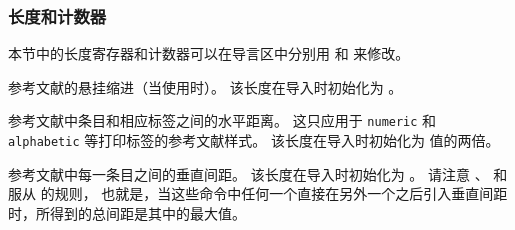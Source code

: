 \subsubsection{长度和计数器}%
\label{use:fmt:len}


本节中的长度寄存器和计数器可以在导言区中分别用  和  来修改。

\begin{ltxsyntax}



参考文献的悬挂缩进（当使用时）。
该长度在导入时初始化为 。



参考文献中条目和相应标签之间的水平距离。
这只应用于 \texttt{numeric} 和 \texttt{alphabetic} 等打印标签的参考文献样式。
该长度在导入时初始化为  值的两倍。



参考文献中每一条目之间的垂直间距。
该长度在导入时初始化为 。
请注意 、 和  服从  的规则，
也就是，当这些命令中任何一个直接在另外一个之后引入垂直间距时，所得到的总间距是其中的最大值。


\end{ltxsyntax}

